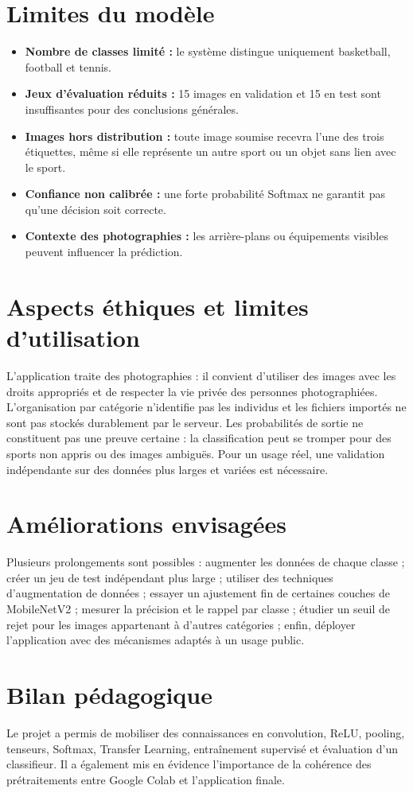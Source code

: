 \documentclass[11pt,a4paper,oneside]{report}
\begin{document}
\section{Limites du modèle}
\begin{itemize}
\item \textbf{Nombre de classes limité :} le système distingue uniquement basketball, football et tennis.
\item \textbf{Jeux d'évaluation réduits :} 15 images en validation et 15 en test sont insuffisantes pour des conclusions générales.
\item \textbf{Images hors distribution :} toute image soumise recevra l'une des trois étiquettes, même si elle représente un autre sport ou un objet sans lien avec le sport.
\item \textbf{Confiance non calibrée :} une forte probabilité Softmax ne garantit pas qu'une décision soit correcte.
\item \textbf{Contexte des photographies :} les arrière-plans ou équipements visibles peuvent influencer la prédiction.
\end{itemize}
\section{Aspects éthiques et limites d'utilisation}
L'application traite des photographies : il convient d'utiliser des images avec les droits appropriés et de respecter la vie privée des personnes photographiées. L'organisation par catégorie n'identifie pas les individus et les fichiers importés ne sont pas stockés durablement par le serveur. Les probabilités de sortie ne constituent pas une preuve certaine : la classification peut se tromper pour des sports non appris ou des images ambiguës. Pour un usage réel, une validation indépendante sur des données plus larges et variées est nécessaire.

\section{Améliorations envisagées}
Plusieurs prolongements sont possibles : augmenter les données de chaque classe ; créer un jeu de test indépendant plus large ; utiliser des techniques d'augmentation de données ; essayer un ajustement fin de certaines couches de MobileNetV2 ; mesurer la précision et le rappel par classe ; étudier un seuil de rejet pour les images appartenant à d'autres catégories ; enfin, déployer l'application avec des mécanismes adaptés à un usage public.
\section{Bilan pédagogique}
Le projet a permis de mobiliser des connaissances en convolution, ReLU, pooling, tenseurs, Softmax, Transfer Learning, entraînement supervisé et évaluation d'un classifieur. Il a également mis en évidence l'importance de la cohérence des prétraitements entre Google Colab et l'application finale.
\end{document}
